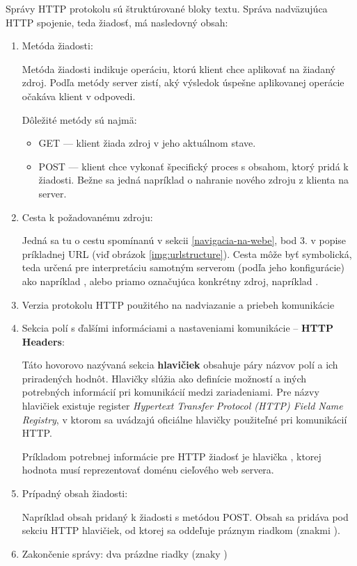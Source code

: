 Správy HTTP protokolu sú štruktúrované bloky textu.
Správa nadväzujúca HTTP spojenie, teda žiadosť, má nasledovný obsah:
\begin{enumerate}
    \item Metóda žiadosti:

    Metóda žiadosti indikuje operáciu, ktorú klient chce aplikovať na žiadaný zdroj.
    Podľa metódy server zistí, aký výsledok úspešne aplikovanej operácie očakáva klient v odpovedi.

    Dôležité metódy sú najmä:
    \begin{itemize}
        \item GET --- klient žiada zdroj v jeho aktuálnom stave. 
        \item POST --- klient chce vykonať špecifický proces s obsahom, ktorý pridá k žiadosti. 
        Bežne sa jedná napríklad o nahranie nového zdroju z klienta na server.
    \end{itemize}
    
    \item Cesta k požadovanému zdroju:

    Jedná sa tu o cestu spomínanú v sekcii \ref{navigacia-na-webe}, bod 3. v popise príkladnej URL (viď obrázok \ref{img:urlstructure}).
    Cesta môže byť symbolická, teda určená pre interpretáciu samotným serverom (podľa jeho konfigurácie) ako napríklad , alebo priamo označujúca konkrétny zdroj, napríklad .  
 
    \item Verzia protokolu HTTP použitého na nadviazanie a priebeh komunikácie
    
    \item Sekcia polí s ďalšími informáciami a nastaveniami komunikácie -- \textbf{HTTP Headers}:
    
    Táto hovorovo nazývaná sekcia \textbf{hlavičiek} obsahuje páry názvov polí a ich priradených hodnôt. 
    Hlavičky slúžia ako definície možností a iných potrebných informácií pri komunikácií medzi zariadeniami.
    Pre názvy hlavičiek existuje register \textit{Hypertext Transfer Protocol (HTTP) Field Name Registry},
    v ktorom sa uvádzajú oficiálne hlavičky použiteľné pri komunikácií HTTP. 

    Príkladom potrebnej informácie pre HTTP žiadosť je hlavička , ktorej hodnota musí reprezentovať doménu cieľového web servera. 
    
    \item Prípadný obsah žiadosti:

    Napríklad obsah pridaný k žiadosti s metódou POST. 
    Obsah sa pridáva pod sekciu HTTP hlavičiek, od ktorej sa oddeľuje práznym riadkom (znakmi ).

    \item Zakončenie správy: dva prázdne riadky (znaky )

\end{enumerate}


